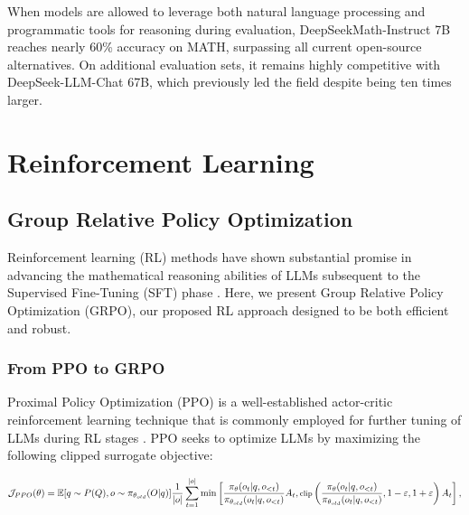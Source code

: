 When models are allowed to leverage both natural language processing and programmatic tools for reasoning during evaluation, DeepSeekMath-Instruct 7B reaches nearly 60\% accuracy on MATH, surpassing all current open-source alternatives. On additional evaluation sets, it remains highly competitive with DeepSeek-LLM-Chat 67B, which previously led the field despite being ten times larger.

\section{Reinforcement Learning}

\subsection{Group Relative Policy Optimization} Reinforcement learning (RL) methods have shown substantial promise in advancing the mathematical reasoning abilities of LLMs subsequent to the Supervised Fine-Tuning (SFT) phase \citep{wang2023math,wizardmath}. Here, we present Group Relative Policy Optimization (GRPO), our proposed RL approach designed to be both efficient and robust.

\subsubsection{From PPO to GRPO} Proximal Policy Optimization (PPO) \citep{schulman2017proximal} is a well-established actor-critic reinforcement learning technique that is commonly employed for further tuning of LLMs during RL stages \citep{ouyang2022training}. PPO seeks to optimize LLMs by maximizing the following clipped surrogate objective:

\begin{equation}
\footnotesize
                \mathcal{J}_{PPO}(\theta) = \mathbb{E}{[q \sim P(Q), o \sim \pi_{\theta_{old}}(O|q)]} \frac{1}{|o|} \sum_{t=1}^{|o|} \min \left[ \frac{\pi_\theta(o_{t} | q, o_{<t})}{\pi_{\theta_{old}}(o_{t} | q, o_{<t})} A_{t}, \text{clip} \left( \frac{\pi_\theta(o_{t} | q, o_{<t})}{\pi_{\theta_{old}}(o_{t} | q, o_{<t})}, 1 - \varepsilon, 1 + \varepsilon \right)  A_{t} \right] ,
\end{equation}

